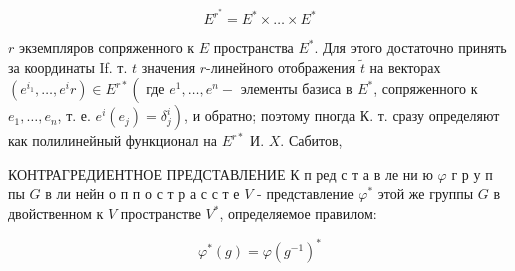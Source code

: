 \documentclass[10pt]{article}
\begin{document}
\[

E^{r^{*}}=E^{*} \times \ldots \times E^{*}

\]



$r$ экземпляров сопряженного к $E$ пространства $E^{*}$. Для этого достаточно принять за координаты If. т. $t$ значения $r$-линейного отображения $\tilde{t}$ на векторах $\left(e^{i_{1}}, \ldots, e^{i} r\right) \in E^{r *}\left(\right.$ где $e^{1}, \ldots, e^{n}-$ элементы базиса в $E^{*}$, сопряженного к $e_{1}, \ldots, e_{n}$, т. е. $\left.e^{i}\left(e_{j}\right)=\delta_{j}^{i}\right)$, и обратно; поэтому пногда $К$. т. сразу определяют как полилинейный функционал на $E^{r *}$ И. $X$. Сабитов,



КОНТРАГРЕДИЕНТНОЕ ПРЕДСТАВЛЕНИЕ К п ред с т а в ле ни ю $\varphi$ г р у п пы $G$ в ли нейн о п п о с т р а с с т е $V$ - представление $\varphi^{*}$ этой же группы $G$ в двойственном к $V$ пространстве $V^{*}$, определяемое правилом:



\[

\varphi^{*}(g)=\varphi\left(g^{-1}\right)^{*}

\]
\end{document}
